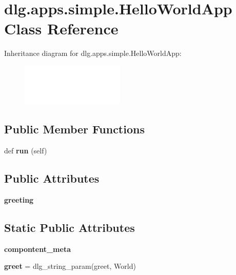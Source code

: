 \hypertarget{classdlg_1_1apps_1_1simple_1_1_hello_world_app}{}\section{dlg.\+apps.\+simple.\+Hello\+World\+App Class Reference}
\label{classdlg_1_1apps_1_1simple_1_1_hello_world_app}
Inheritance diagram for dlg.\+apps.\+simple.\+Hello\+World\+App\+:\begin{figure}[H]
\begin{center}
\leavevmode
\includegraphics[height=2.000000cm]{classdlg_1_1apps_1_1simple_1_1_hello_world_app}
\end{center}
\end{figure}
\subsection*{Public Member Functions}
\begin{DoxyCompactItemize}
\item 
\mbox{\label{classdlg_1_1apps_1_1simple_1_1_hello_world_app_a5e1a641e2310740099ce9e01a1e8695c}} 
def {\bfseries run} (self)
\end{DoxyCompactItemize}
\subsection*{Public Attributes}
\begin{DoxyCompactItemize}
\item 
\mbox{\label{classdlg_1_1apps_1_1simple_1_1_hello_world_app_a53f096cb2e9b003fe83f8f39e873746b}} 
{\bfseries greeting}
\end{DoxyCompactItemize}
\subsection*{Static Public Attributes}
\begin{DoxyCompactItemize}
\item 
{\bfseries compontent\+\_\+meta}
\item 
\mbox{\label{classdlg_1_1apps_1_1simple_1_1_hello_world_app_aa9a59fff0c1caee25b46d942138b8c86}} 
{\bfseries greet} = dlg\+\_\+string\+\_\+param(\textquotesingle{}greet\textquotesingle{}, \textquotesingle{}World\textquotesingle{})
\end{DoxyCompactItemize}


